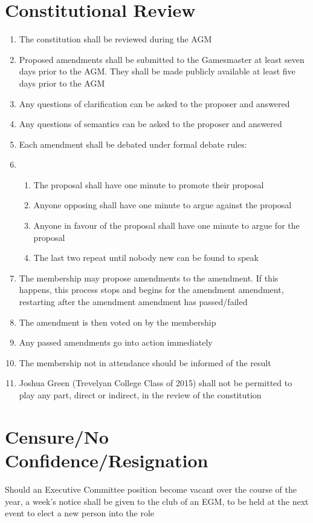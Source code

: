 \documentclass[hidelinks, 12pt, a4paper]{article}
\begin{document}
\section{Constitutional Review}
\begin{enumerate}
	\item The constitution shall be reviewed during the AGM
	\item Proposed amendments shall be submitted to the Gamesmaster at least seven days prior to the AGM. They shall be made publicly available at least five days prior to the AGM
	\item Any questions of clarification can be asked to the proposer and answered
	\item Any questions of semantics can be asked to the proposer and answered
	\item Each amendment shall be debated under formal debate rules:
	\item \begin{enumerate}
		\item The proposal shall have one minute to promote their proposal
		\item Anyone opposing shall have one minute to argue against the proposal
		\item Anyone in favour of the proposal shall have one minute to argue for the proposal
		\item The last two repeat until nobody new can be found to speak
	\end{enumerate}
	\item The membership may propose amendments to the amendment. If this happens, this process stops and begins for the amendment amendment, restarting after the amendment amendment has passed/failed
	\item The amendment is then voted on by the membership 
	\item Any passed amendments go into action immediately
	\item The membership not in attendance should be informed of the result
	\item Joshua Green (Trevelyan College Class of 2015) shall not be permitted to play any part, direct or indirect, in the review of the constitution
\end{enumerate}

\section{Censure/No Confidence/Resignation}
Should an Executive Committee position become vacant over the course of the year, a week’s notice shall be given to the club of an EGM, to be held at the next event to elect a new person into the role
\end{document}
